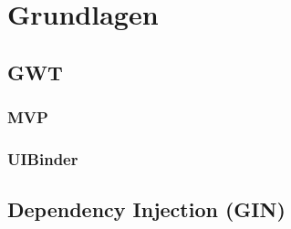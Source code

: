 \section{Grundlagen}

\subsection{GWT}

\subsubsection{MVP}

\subsubsection{UIBinder}

\subsection{Dependency Injection (GIN)}